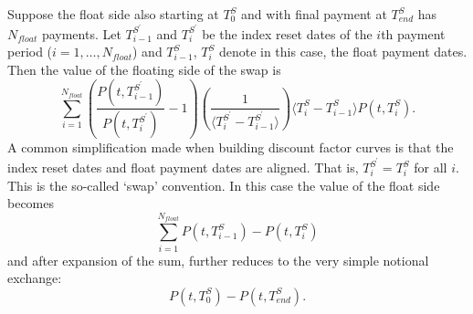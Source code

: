 \documentclass[a4paper]{article}
\begin{document}
Suppose the float side also starting at $T^{S}_{0}$ and with final payment at $T^{S}_{end}$ has $N_{float}$ payments. Let $T^{S^{\prime}}_{i-1}$ and $T^{S^{\prime}}_{i}$ be the index reset dates of the $i$th payment period ($i = 1, \ldots, N_{float}$) and $T^{S}_{i-1}$, $T^{S}_{i}$ denote in this case, the float payment dates. Then the value of the floating side of the swap is
\begin{equation}
  \sum_{i=1}^{N_{float}}\left(\frac{P(t, T^{S^{\prime}}_{i-1})}{P(t, T^{S^{\prime}}_{i})}-1\right)\left(\frac{1}{\langle T^{S^{\prime}}_{i}-T^{S^{\prime}}_{i-1}\rangle}\right)\langle T^{S}_{i}-T^{S}_{i-1} \rangle P(t, T^{S}_{i}).
\end{equation}
A common simplification made when building discount factor curves is that the index reset dates and float payment dates are aligned. That is, $T^{S^{\prime}}_{i} = T^{S}_{i}$ for all $i$. This is the so-called `swap' convention. In this case the value of the float side becomes
\[
  \sum_{i=1}^{N_{float}}P(t, T^{S}_{i-1})-P(t, T^{S}_{i})
\] and after expansion of the sum, further reduces to the very simple notional exchange:
\begin{equation}
  P(t, T^{S}_{0}) - P(t, T^{S}_{end}).  \label{eq:swap-float-side-value}
\end{equation}
\end{document}
